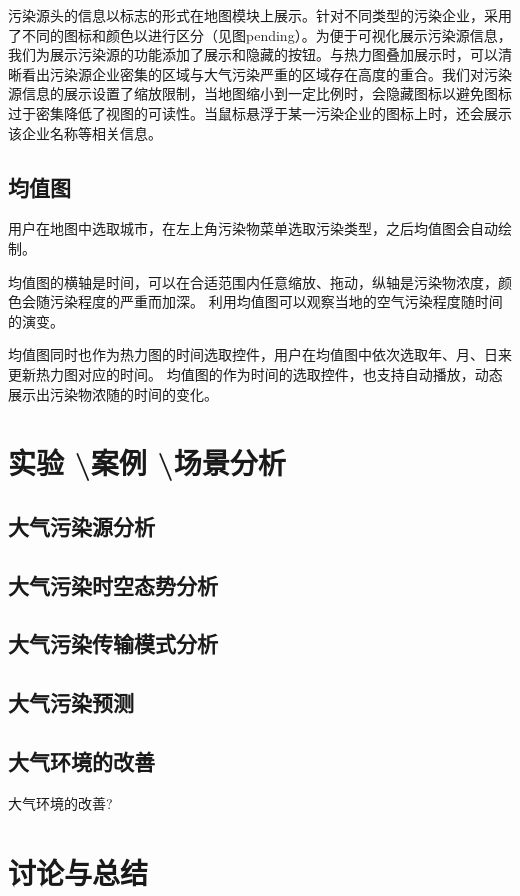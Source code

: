 \documentclass[UTF8]{ctexrep}
\begin{document}
    污染源头的信息以标志的形式在地图模块上展示。针对不同类型的污染企业，采用了不同的图标和颜色以进行区分（见图pending）。为便于可视化展示污染源信息，我们为展示污染源的功能添加了展示和隐藏的按钮。与热力图叠加展示时，可以清晰看出污染源企业密集的区域与大气污染严重的区域存在高度的重合。我们对污染源信息的展示设置了缩放限制，当地图缩小到一定比例时，会隐藏图标以避免图标过于密集降低了视图的可读性。当鼠标悬浮于某一污染企业的图标上时，还会展示该企业名称等相关信息。\\

    \subsection{均值图}
    用户在地图中选取城市，在左上角污染物菜单选取污染类型，之后均值图会自动绘制。
    \par
    均值图的横轴是时间，可以在合适范围内任意缩放、拖动，纵轴是污染物浓度，颜色会随污染程度的严重而加深。
    利用均值图可以观察当地的空气污染程度随时间的演变。
    \par
    均值图同时也作为热力图的时间选取控件，用户在均值图中依次选取年、月、日来更新热力图对应的时间。
    均值图的作为时间的选取控件，也支持自动播放，动态展示出污染物浓随的时间的变化。
    \par

    \section{实验 \textbackslash 案例 \textbackslash 场景分析}

    \subsection{大气污染源分析}

    \subsection{大气污染时空态势分析}

    \subsection{大气污染传输模式分析}

    \subsection{大气污染预测}

    \subsection{大气环境的改善}
    大气环境的改善?
    \par

    \section{讨论与总结}
    
\end{document}
